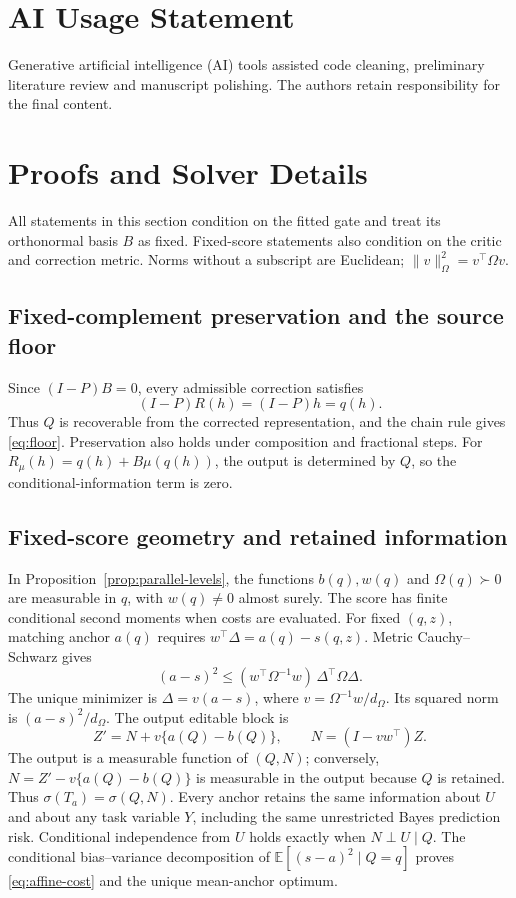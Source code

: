 \documentclass{article}
\theoremstyle{plain}
\theoremstyle{definition}
\newcommand{\E}{\mathbb E}
\begin{document}
\section*{AI Usage Statement}
Generative artificial intelligence (AI) tools assisted code cleaning,
preliminary literature review and manuscript polishing. The authors retain
responsibility for the final content.


\clearpage
\appendix
\section{Proofs and Solver Details}
\label{app:proofs}
All statements in this section condition on the fitted gate and treat its
orthonormal basis $B$ as fixed. Fixed-score statements also condition on the
critic and correction metric. Norms without a subscript are Euclidean;
$\|v\|_\Omega^2=v^\top\Omega v$.

\subsection{Fixed-complement preservation and the source floor}
\label{app:fixed-complement}
Since $(I-P)B=0$, every admissible correction satisfies
\[
 (I-P)R(h)=(I-P)h=q(h).
\]
Thus $Q$ is recoverable from the corrected representation, and the chain
rule gives \eqref{eq:floor}. Preservation also holds under composition and
fractional steps. For $R_\mu(h)=q(h)+B\mu(q(h))$, the output is determined
by $Q$, so the conditional-information term is zero.

\subsection{Fixed-score geometry and retained information}
\label{app:affine-levels}
\label{app:euclidean-anchor}
In Proposition~\ref{prop:parallel-levels}, the functions $b(q),w(q)$ and
$\Omega(q)\succ0$ are measurable in $q$, with $w(q)\ne0$ almost surely.
The score has finite conditional second moments when costs are evaluated.
For fixed $(q,z)$, matching anchor $a(q)$ requires
$w^\top\Delta=a(q)-s(q,z)$. Metric Cauchy--Schwarz gives
\[
 (a-s)^2\le(w^\top\Omega^{-1}w)\,\Delta^\top\Omega\Delta.
\]
The unique minimizer is $\Delta=v(a-s)$, where
$v=\Omega^{-1}w/d_\Omega$. Its squared norm is $(a-s)^2/d_\Omega$.
The output editable block is
\[
 Z'=N+v\{a(Q)-b(Q)\},\qquad N=(I-vw^\top)Z.
\]
The output is a measurable function of $(Q,N)$; conversely,
$N=Z'-v\{a(Q)-b(Q)\}$ is measurable in the output because $Q$ is
retained. Thus $\sigma(T_a)=\sigma(Q,N)$. Every anchor retains the same
information about $U$ and about any task variable $Y$, including the same
unrestricted Bayes prediction risk. Conditional independence from $U$
holds exactly when $N\perp U\mid Q$. The conditional bias--variance
decomposition of $\E[(s-a)^2\mid Q=q]$ proves
\eqref{eq:affine-cost} and the unique mean-anchor optimum.
\end{document}
